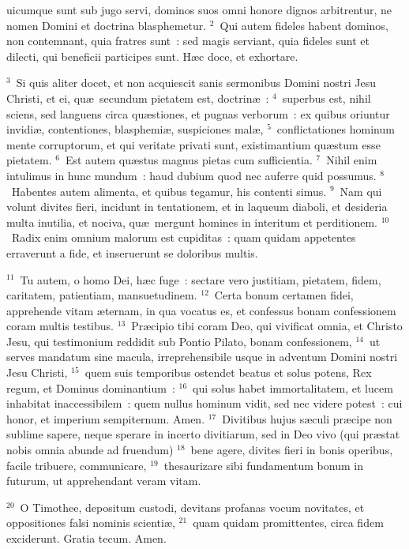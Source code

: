 \bchapter
{}uicumque sunt sub jugo servi, dominos suos omni honore dignos arbitrentur, ne nomen Domini et doctrina blasphemetur.
${}^{2}$~Qui autem fideles habent dominos, non contemnant, quia fratres sunt~: sed magis serviant, quia fideles sunt et dilecti, qui beneficii participes sunt. H\ae c doce, et exhortare.


${}^{3}$~Si quis aliter docet, et non acquiescit sanis sermonibus Domini nostri Jesu Christi, et ei, qu\ae\ secundum pietatem est, doctrin\ae~:
${}^{4}$~superbus est, nihil sciens, sed languens circa qu\ae stiones, et pugnas verborum~: ex quibus oriuntur invidi\ae , contentiones, blasphemi\ae , suspiciones mal\ae ,
${}^{5}$~conflictationes hominum mente corruptorum, et qui veritate privati sunt, existimantium qu\ae stum esse pietatem.
${}^{6}$~Est autem qu\ae stus magnus pietas cum sufficientia.
${}^{7}$~Nihil enim intulimus in hunc mundum~: haud dubium quod nec auferre quid possumus.
${}^{8}$~Habentes autem alimenta, et quibus tegamur, his contenti simus.
${}^{9}$~Nam qui volunt divites fieri, incidunt in tentationem, et in laqueum diaboli, et desideria multa inutilia, et nociva, qu\ae\ mergunt homines in interitum et perditionem.
${}^{10}$~Radix enim omnium malorum est cupiditas~: quam quidam appetentes erraverunt a fide, et inseruerunt se doloribus multis.


${}^{11}$~Tu autem, o homo Dei, h\ae c fuge~: sectare vero justitiam, pietatem, fidem, caritatem, patientiam, mansuetudinem.
${}^{12}$~Certa bonum certamen fidei, apprehende vitam \ae ternam, in qua vocatus es, et confessus bonam confessionem coram multis testibus.
${}^{13}$~Pr\ae cipio tibi coram Deo, qui vivificat omnia, et Christo Jesu, qui testimonium reddidit sub Pontio Pilato, bonam confessionem,
${}^{14}$~ut serves mandatum sine macula, irreprehensibile usque in adventum Domini nostri Jesu Christi,
${}^{15}$~quem suis temporibus ostendet beatus et solus potens, Rex regum, et Dominus dominantium~:
${}^{16}$~qui solus habet immortalitatem, et lucem inhabitat inaccessibilem~: quem nullus hominum vidit, sed nec videre potest~: cui honor, et imperium sempiternum. Amen.
${}^{17}$~Divitibus hujus s\ae culi pr\ae cipe non sublime sapere, neque sperare in incerto divitiarum, sed in Deo vivo (qui pr\ae stat nobis omnia abunde ad fruendum)
${}^{18}$~bene agere, divites fieri in bonis operibus, facile tribuere, communicare,
${}^{19}$~thesaurizare sibi fundamentum bonum in futurum, ut apprehendant veram vitam.


${}^{20}$~O Timothee, depositum custodi, devitans profanas vocum novitates, et oppositiones falsi nominis scienti\ae ,
${}^{21}$~quam quidam promittentes, circa fidem exciderunt. Gratia tecum. Amen.
